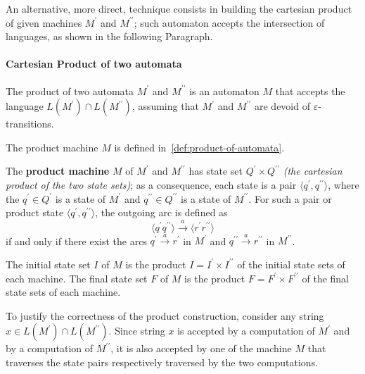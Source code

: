 \documentclass[english]{article}
\begin{document}
An alternative, more direct, technique consists in building the cartesian product of given machines \(M^\prime\) and \(M^{\prime\prime}\);
such automaton accepts the intersection of languages, as shown in the following Paragraph.

\paragraph{Cartesian Product of two automata}

The product of two automata \(M^\prime\) and \(M^{\prime\prime}\) is an automaton \(M\) that accepts the language \(L(M^\prime) \cap L(M^{\prime\prime})\), assuming that \(M^\prime\) and \(M^{\prime\prime}\) are devoid of \(\varepsilon\)-transitions.

The product machine \(M\) is defined in~\ref{def:product-of-automata}.

\begin{definition}
  \label{def:product-of-automata}
  The \textbf{product machine} \(M\) of \(M^\prime\) and \(M^{\prime\prime}\) has state set \(Q^\prime \times Q^{\prime\prime}\) \textit{(the cartesian product of the two state sets)};
  as a consequence, each state is a pair \(\langle q^\prime,q^{\prime\prime} \rangle\), where the \(q^\prime \in Q^\prime\) is a state of \(M^\prime\) and \(q^{\prime\prime} \in Q^{\prime\prime}\) is a state of \(M^{\prime\prime}\).
  For such a pair or product state \(\langle q^\prime,q^{\prime\prime} \rangle\), the outgoing arc is defined as
  \[ \langle q^\prime q^{\prime\prime} \rangle \xrightarrow{a} \langle r^\prime r^{\prime\prime} \rangle \]
  if and only if there exist the arcs \(q^\prime \xrightarrow{a} r^\prime\) in \(M^\prime\) and \(q^{\prime\prime} \xrightarrow{a} r^{\prime\prime}\) in \(M^{\prime\prime}\).

  The initial state set \(I\) of \(M\) is the product \(I = I^\prime \times I^{\prime\prime}\) of the initial state sets of each machine.
  The final state set \(F\) of \(M\) is the product \(F = F^\prime \times F^{\prime\prime}\) of the final state sets of each machine.
\end{definition}

To justify the correctness of the product construction, consider any string \(x \in L(M^\prime) \cap L(M^{\prime\prime})\).
Since string \(x\) is accepted by a computation of \(M^\prime\) and by a computation of \(M^{\prime\prime}\), it is also accepted by one of the machine \(M\) that traverses the state pairs respectively traversed by the two computations.
\end{document}

